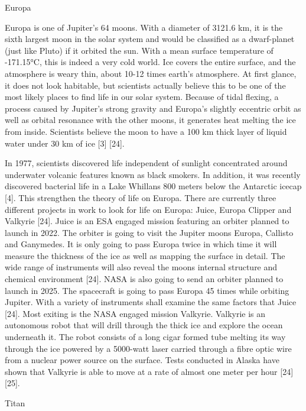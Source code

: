 Europa
 
Europa is one of Jupiter’s 64 moons. With a diameter of 3121.6 km, it is the sixth largest moon in the solar system and would be classified as a dwarf-planet (just like Pluto) if it orbited the sun.
With a mean surface temperature of -171.15°C, this is indeed a very cold world. Ice covers the entire surface, and the atmosphere is weary thin, about 10-12 times earth’s atmosphere. At first glance, it does not look habitable, but scientists actually believe this to be one of the most likely places to find life in our solar system. Because of tidal flexing, a process caused by Jupiter’s strong gravity and Europa’s slightly eccentric orbit as well as orbital resonance with the other moons, it generates heat melting the ice from inside. Scientists believe the moon to have a 100 km thick layer of liquid water under 30 km of ice [3] [24].
 
In 1977, scientists discovered life independent of sunlight concentrated around underwater volcanic features known as black smokers. In addition, it was recently discovered bacterial life in a Lake Whillans 800 meters below the Antarctic icecap [4]. This strengthen the theory of life on Europa.
There are currently three different projects in work to look for life on Europa: Juice, Europa Clipper and Valkyrie [24].
Juice is an ESA engaged mission featuring an orbiter planned to launch in 2022. The orbiter is going to visit the Jupiter moons Europa, Callisto and Ganymedes. It is only going to pass Europa twice in which time it will measure the thickness of the ice as well as mapping the surface in detail. The wide range of instruments will also reveal the moons internal structure and chemical environment [24].
NASA is also going to send an orbiter planned to launch in 2025. The spacecraft is going to pass Europa 45 times while orbiting Jupiter. With a variety of instruments shall examine the same factors that Juice [24].
Most exiting is the NASA engaged mission Valkyrie. Valkyrie is an autonomous robot that will drill through the thick ice and explore the ocean underneath it.
The robot consists of a long cigar formed tube melting its way through the ice powered by a 5000-watt laser carried through a fibre optic wire from a nuclear power source on the surface. Tests conducted in Alaska have shown that Valkyrie is able to move at a rate of almost one meter per hour [24] [25].

Titan
 
